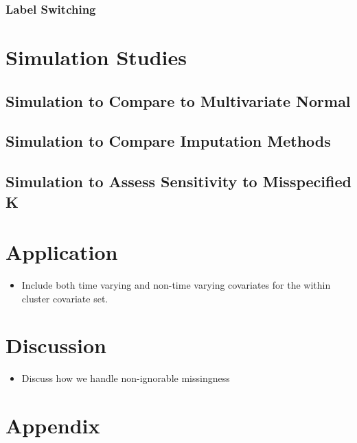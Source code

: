 \documentclass[useAMS,referee]{biom}
\begin{document}
\subsubsection{Label Switching}


\newpage

\section{Simulation Studies}
\label{s:sim}

\subsection{Simulation to Compare to Multivariate Normal}

\subsection{Simulation to Compare Imputation Methods}

\subsection{Simulation to Assess Sensitivity to Misspecified K}

\newpage

\section{Application}
\label{s:app}

\begin{itemize}

\item Include both time varying and non-time varying covariates for the within cluster covariate set. 

\end{itemize}

\newpage

\section{Discussion}
\label{s:discuss}

\begin{itemize}

\item Discuss how we handle non-ignorable missingness 

\end{itemize}


\section{Appendix}
\end{document}
